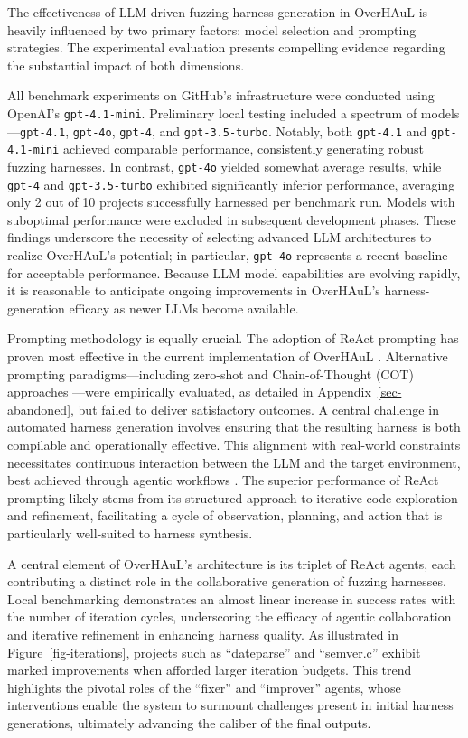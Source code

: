 \documentclass[
  a4paper,
]{scrreprt}
\theoremstyle{definition}
\theoremstyle{remark}
\begin{document}
The effectiveness of LLM-driven fuzzing harness generation in OverHAuL
is heavily influenced by two primary factors: model selection and
prompting strategies. The experimental evaluation presents compelling
evidence regarding the substantial impact of both dimensions.

All benchmark experiments on GitHub's infrastructure were conducted
using OpenAI's \texttt{gpt-4.1-mini}. Preliminary local testing included
a spectrum of models---\texttt{gpt-4.1}, \texttt{gpt-4o},
\texttt{gpt-4}, and \texttt{gpt-3.5-turbo}. Notably, both
\texttt{gpt-4.1} and \texttt{gpt-4.1-mini} achieved comparable
performance, consistently generating robust fuzzing harnesses. In
contrast, \texttt{gpt-4o} yielded somewhat average results, while
\texttt{gpt-4} and \texttt{gpt-3.5-turbo} exhibited significantly
inferior performance, averaging only 2 out of 10 projects successfully
harnessed per benchmark run. Models with suboptimal performance were
excluded in subsequent development phases. These findings underscore the
necessity of selecting advanced LLM architectures to realize OverHAuL's
potential; in particular, \texttt{gpt-4o} represents a recent baseline
for acceptable performance. Because LLM model capabilities are evolving
rapidly, it is reasonable to anticipate ongoing improvements in
OverHAuL's harness-generation efficacy as newer LLMs become available.

Prompting methodology is equally crucial. The adoption of ReAct
prompting has proven most effective in the current implementation of
OverHAuL \autocite{reAct}. Alternative prompting paradigms---including
zero-shot and Chain-of-Thought (COT) approaches
\autocite{chainofthought}---were empirically evaluated, as detailed in
Appendix~\ref{sec-abandoned}, but failed to deliver satisfactory
outcomes. A central challenge in automated harness generation involves
ensuring that the resulting harness is both compilable and operationally
effective. This alignment with real-world constraints necessitates
continuous interaction between the LLM and the target environment, best
achieved through agentic workflows \autocite{giannone2025}. The superior
performance of ReAct prompting likely stems from its structured approach
to iterative code exploration and refinement, facilitating a cycle of
observation, planning, and action that is particularly well-suited to
harness synthesis.

A central element of OverHAuL's architecture is its triplet of ReAct
agents, each contributing a distinct role in the collaborative
generation of fuzzing harnesses. Local benchmarking demonstrates an
almost linear increase in success rates with the number of iteration
cycles, underscoring the efficacy of agentic collaboration and iterative
refinement in enhancing harness quality. As illustrated in
Figure~\ref{fig-iterations}, projects such as ``dateparse'' and
``semver.c'' exhibit marked improvements when afforded larger iteration
budgets. This trend highlights the pivotal roles of the ``fixer'' and
``improver'' agents, whose interventions enable the system to surmount
challenges present in initial harness generations, ultimately advancing
the caliber of the final outputs.
\end{document}

